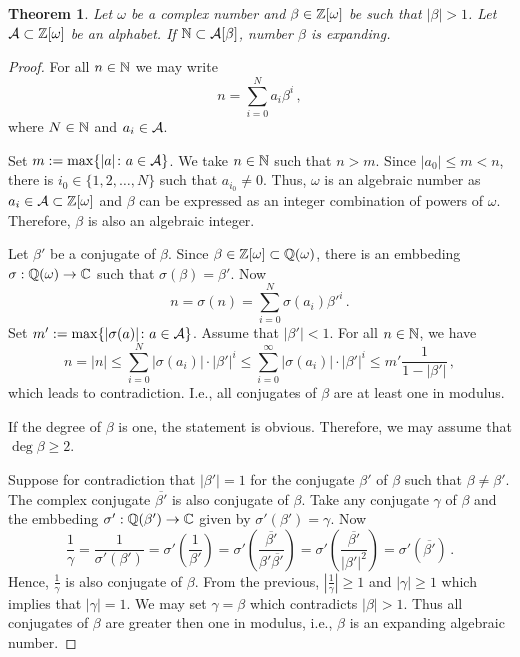 \documentclass{article}
\newtheorem{theo}{Theorem}
\newtheorem{lem}[theo]{Lemma}
\begin{document}




\begin{theo}
\label{thm:betaExpanding}
    Let $\omega$ be a complex number and $\beta \in\mathbb{Z}[\omega]$ be such that $|\beta|>1$. Let $\mathcal{A}\subset \mathbb{Z}[\omega]$ be an alphabet. If $\mathbb{N}\subset \mathcal{A}[\beta]$, number $\beta$ is expanding.
\end{theo}
\begin{proof}
For all $n\in\mathbb{N}$ we may write 
    $$
    n=\sum_{i=0}^{N}a_i\beta^i\,,
    $$
    where $N\in\mathbb{N}$ and $a_i\in\mathcal{A}$.
    
    Set $m:= \max\{|a|\colon a\in\mathcal{A}\}$. We take $n\in\mathbb{N}$ such that $n>m$. 
    Since $|a_0|\leq m<n$, there is $i_0 \in \{1,2,\dots,N\}$ such that $a_{i_0}\neq 0$. Thus, $\omega$ is an algebraic number as $a_i\in\mathcal{A}\subset\mathbb{Z}[\omega]$ and $\beta$ can be expressed as an integer combination of powers of $\omega$. Therefore, $\beta$ is also an algebraic integer.
    
    Let $\beta'$ be a conjugate of $\beta$.  
    Since $\beta\in\mathbb{Z}[\omega]\subset\mathbb{Q}(\omega)$, there is an embbeding $\sigma: \mathbb{Q}(\omega)\rightarrow \mathbb{C}$ such that $\sigma(\beta)=\beta'$. Now 
    $$
    n=\sigma(n)=\sum_{i=0}^{N}\sigma(a_i)\beta'^i\,.
    $$
    Set $m':= \max\{|\sigma(a)|\colon a\in\mathcal{A}\}$.  Assume that $|\beta'|<1$. For all $n\in\mathbb{N}$, we have 
    $$
    n=|n|\leq\sum_{i=0}^{N}|\sigma(a_i)|\cdot|\beta'|^i \leq \sum_{i=0}^{\infty}|\sigma(a_i)|\cdot|\beta'|^i \leq m'\frac{1}{1-|\beta'|}\,,  
    $$
    which leads to contradiction. I.e., all conjugates of $\beta$ are at least one in modulus.
    
    If the degree of $\beta$ is one, the statement is obvious.  Therefore, we may assume that $\deg \beta \geq 2$. 
    
    Suppose  for contradiction that $|\beta'|=1$ for the conjugate $\beta'$  of $\beta$ such that $\beta\neq\beta'$. The complex conjugate $\overline{\beta'}$ is also conjugate of $\beta$. Take any conjugate $\gamma$ of $\beta$ and the embbeding $\sigma': \mathbb{Q}(\beta')\rightarrow \mathbb{C}$ given by $\sigma'(\beta')=\gamma$.
    Now
    $$
    \frac{1}{\gamma}=\frac{1}{\sigma'(\beta')}=\sigma'\left(\frac{1}{\beta'}\right)=\sigma'\left(\frac{\overline{\beta'}}{\beta'\overline{\beta'}}\right)=\sigma'\left(\frac{\overline{\beta'}}{|\beta'|^2}\right)=\sigma'(\overline{\beta'})\,.
    $$
    Hence, $\frac{1}{\gamma}$ is also conjugate of $\beta$. From the previous, $\left|\frac{1}{\gamma}\right|\geq 1$ and $|\gamma|\geq 1$ which implies that $|\gamma|=1$. We may set $\gamma=\beta$ which contradicts $|\beta|>1$. Thus all conjugates of $\beta$ are greater then one in modulus, i.e., $\beta$ is an expanding algebraic number.
\end{proof}
\end{document}
